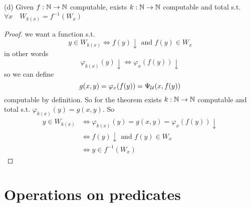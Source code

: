 (d) Given $f : \mathbb{N} \rightarrow \mathbb{N}$ computable, exists $k : \mathbb{N} \rightarrow \mathbb{N}$
computable and total s.t. $\forall x \quad W_{k(x)} = f^{-1}(W_x)$
\begin{proof}
  we want a function s.t.
  \[y \in W_{k(x)} \Leftrightarrow f(y) \downarrow \mbox{ and } f(y)
    \in W_x \]
  in other words
  \[\varphi_{k(x)}(y) \downarrow \Leftrightarrow \varphi_x(f(y))
    \downarrow\]
  so we can define
  \[g(x,y) = \varphi_x(f(y)) = \Psi_{\mathcal{U}}(x, f(y))\] computable by
  definition. So for the \smn theorem exists $k: \mathbb{N} \rightarrow \mathbb{N}$ computable
  and total s.t. \(\varphi_{k(x)}(y) = g(x,y)\). So
  \[
    \begin{split}
      y \in W_{k(x)} & \Leftrightarrow \varphi_{k(x)}(y) = g(x,y) = \varphi_x(f(y)) \downarrow \\
      & \Leftrightarrow f(y)\downarrow \mbox{ and } f(y) \in W_x \\
      & \Leftrightarrow y \in f^{-1}(W_x)
    \end{split}
  \]
\end{proof}

\section{Operations on predicates}







